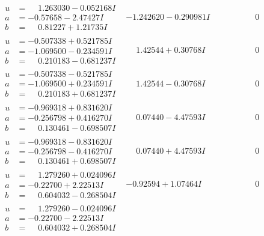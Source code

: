 \documentclass[1p]{elsarticle_modified}
\theoremstyle{definition}
\begin{document}
$$\begin{array}{c|c|c}
\begin{aligned}
u &= \phantom{-}1.263030 - 0.052168 I \\
a &= -0.57658 - 2.47427 I \\
b &= \phantom{-}0.81227 + 1.21735 I\end{aligned}
 & -1.242620 - 0.290981 I & \phantom{-0.000000 } 0 \\ \hline\begin{aligned}
u &= -0.507338 + 0.521785 I \\
a &= -1.069500 - 0.234591 I \\
b &= \phantom{-}0.210183 - 0.681237 I\end{aligned}
 & \phantom{-}1.42544 + 0.30768 I & \phantom{-0.000000 } 0 \\ \hline\begin{aligned}
u &= -0.507338 - 0.521785 I \\
a &= -1.069500 + 0.234591 I \\
b &= \phantom{-}0.210183 + 0.681237 I\end{aligned}
 & \phantom{-}1.42544 - 0.30768 I & \phantom{-0.000000 } 0 \\ \hline\begin{aligned}
u &= -0.969318 + 0.831620 I \\
a &= -0.256798 + 0.416270 I \\
b &= \phantom{-}0.130461 - 0.698507 I\end{aligned}
 & \phantom{-}0.07440 - 4.47593 I & \phantom{-0.000000 } 0 \\ \hline\begin{aligned}
u &= -0.969318 - 0.831620 I \\
a &= -0.256798 - 0.416270 I \\
b &= \phantom{-}0.130461 + 0.698507 I\end{aligned}
 & \phantom{-}0.07440 + 4.47593 I & \phantom{-0.000000 } 0 \\ \hline\begin{aligned}
u &= \phantom{-}1.279260 + 0.024096 I \\
a &= -0.22700 + 2.22513 I \\
b &= \phantom{-}0.604032 - 0.268504 I\end{aligned}
 & -0.92594 + 1.07464 I & \phantom{-0.000000 } 0 \\ \hline\begin{aligned}
u &= \phantom{-}1.279260 - 0.024096 I \\
a &= -0.22700 - 2.22513 I \\
b &= \phantom{-}0.604032 + 0.268504 I\end{aligned}

\end{array}$$
\end{document}

